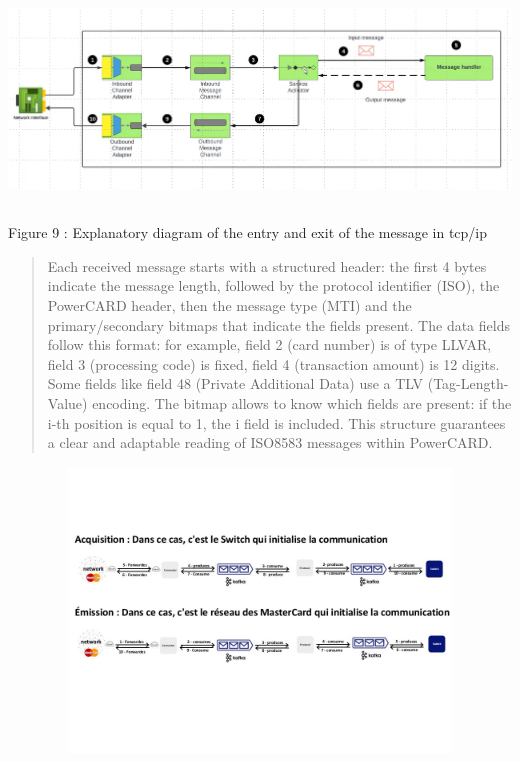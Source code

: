 \documentclass[12pt,a4paper]{report}
\begin{document}
\includegraphics[width=6.10918in,height=2.20398in]{vertopal_d1b0b2209edd4c6aa8254f57daa0953b/media/image28.png}

\protect\hypertarget{_Toc201954485}{}{}Figure 9 : Explanatory diagram of
the entry and exit of the message in tcp/ip

\begin{quote}
Each received message starts with a structured header: the first 4 bytes
indicate the message length, followed by the protocol identifier (ISO),
the PowerCARD header, then the message type (MTI) and the
primary/secondary bitmaps that indicate the fields present. The data
fields follow this format: for example, field 2 (card number) is of type
LLVAR, field 3 (processing code) is fixed, field 4 (transaction amount)
is 12 digits. Some fields like field 48 (Private Additional Data) use a
TLV (Tag-Length-Value) encoding. The bitmap allows to know which fields
are present: if the i-th position is equal to 1, the i field is
included. This structure guarantees a clear and adaptable reading of
ISO8583 messages within PowerCARD.
\end{quote}

\includegraphics[width=7.37731in,height=2.99251in]{vertopal_d1b0b2209edd4c6aa8254f57daa0953b/media/image29.jpeg}
\end{document}
